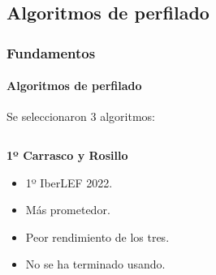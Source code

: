 \documentclass{beamer}
\begin{document}
		\subsection{Algoritmos de perfilado}
		\begin{frame}
			\frametitle{Fundamentos}
			\framesubtitle{Algoritmos de perfilado}
			Se seleccionaron 3 algoritmos:
			\begin{columns}[T]
				\hspace{-3cm}
				\begin{column}{0.8\textwidth}
					\begin{description}[labelwidth=0.01mm]
						\item \textbf{1º Carrasco y Rosillo} 
								\begin{itemize}
									\item 1º IberLEF 2022.\pause
									\item Más prometedor.\pause
									\item Peor rendimiento de los tres.\pause
									\item No se ha terminado usando.\pause


\end{itemize}
\end{description}
\end{column}
\end{columns}
\end{frame}
\end{document}
